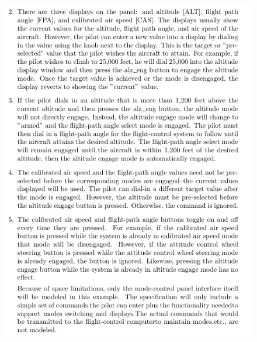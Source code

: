     \begin{figure}[H]
    \vspace{-0.2in}
    \centering
    \begin{minipage}{0.45\textwidth}
    \centering
    \includegraphics[width=\textwidth]{Figures/fullexample/0auto2.png}
    \end{minipage}\hfill
    \begin{minipage}{0.45\textwidth}
    \centering

\end{minipage}
\end{figure}
